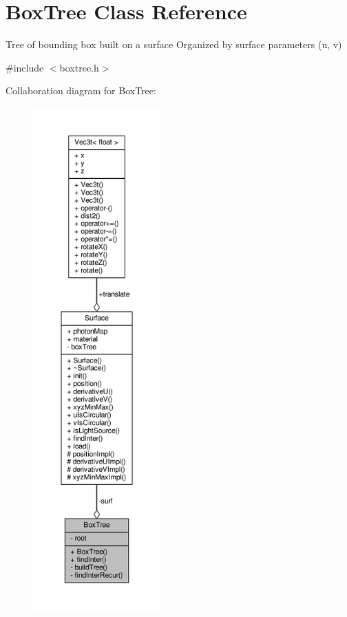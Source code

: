 \hypertarget{classBoxTree}{}\section{Box\+Tree Class Reference}
\label{classBoxTree}


Tree of bounding box built on a surface Organized by surface parameters (u, v)  




{\ttfamily \#include $<$boxtree.\+h$>$}



Collaboration diagram for Box\+Tree\+:\nopagebreak
\begin{figure}[H]
\begin{center}
\leavevmode
\includegraphics[height=550pt]{classBoxTree__coll__graph}
\end{center}
\end{figure}
